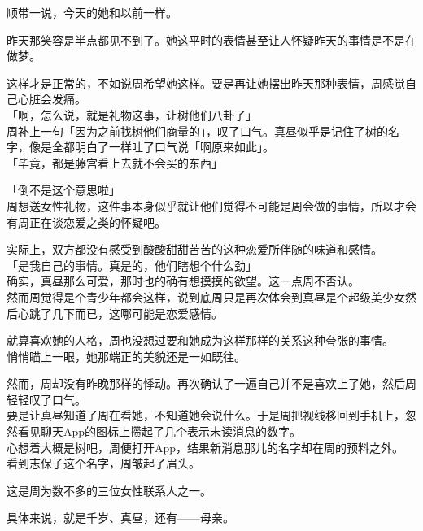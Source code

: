 顺带一说，今天的她和以前一样。

昨天那笑容是半点都见不到了。她这平时的表情甚至让人怀疑昨天的事情是不是在做梦。

这样才是正常的，不如说周希望她这样。要是再让她摆出昨天那种表情，周感觉自己心脏会发痛。\\

「啊，怎么说，就是礼物这事，让树他们八卦了」\\

周补上一句「因为之前找树他们商量的」，叹了口气。真昼似乎是记住了树的名字，像是全都明白了一样吐了口气说「啊原来如此」。\\

「毕竟，都是藤宫看上去就不会买的东西」

「倒不是这个意思啦」\\

周想送女性礼物，这件事本身似乎就让他们觉得不可能是周会做的事情，所以才会有周正在谈恋爱之类的怀疑吧。

实际上，双方都没有感受到酸酸甜甜苦苦的这种恋爱所伴随的味道和感情。\\

「是我自己的事情。真是的，他们瞎想个什么劲」\\

确实，真昼那么可爱，那时也的确有想摸摸的欲望。这一点周不否认。\\

然而周觉得是个青少年都会这样，说到底周只是再次体会到真昼是个超级美少女然后心跳了几下而已，这哪可能是恋爱感情。

就算喜欢她的人格，周也没想过要和她成为这样那样的关系这种夸张的事情。\\

悄悄瞄上一眼，她那端正的美貌还是一如既往。

然而，周却没有昨晚那样的悸动。再次确认了一遍自己并不是喜欢上了她，然后周轻轻叹了口气。\\

要是让真昼知道了周在看她，不知道她会说什么。于是周把视线移回到手机上，忽然看见聊天App的图标上攒起了几个表示未读消息的数字。\\

心想着大概是树吧，周便打开App，结果新消息那儿的名字却在周的预料之外。\\

看到志保子这个名字，周皱起了眉头。

这是周为数不多的三位女性联系人之一。

具体来说，就是千岁、真昼，还有——母亲。\\

